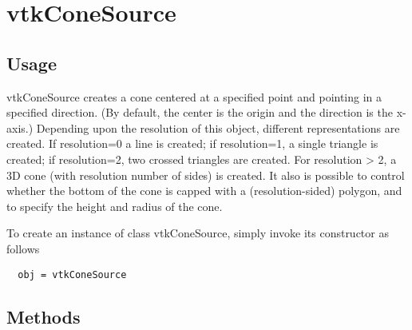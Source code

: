 \section{vtkConeSource}

\subsection{Usage}

 vtkConeSource creates a cone centered at a specified point and pointing in
 a specified direction. (By default, the center is the origin and the
 direction is the x-axis.) Depending upon the resolution of this object,
 different representations are created. If resolution=0 a line is created;
 if resolution=1, a single triangle is created; if resolution=2, two
 crossed triangles are created. For resolution > 2, a 3D cone (with
 resolution number of sides) is created. It also is possible to control
 whether the bottom of the cone is capped with a (resolution-sided)
 polygon, and to specify the height and radius of the cone.

To create an instance of class vtkConeSource, simply
invoke its constructor as follows
\begin{verbatim}
  obj = vtkConeSource
\end{verbatim}
\subsection{Methods}

